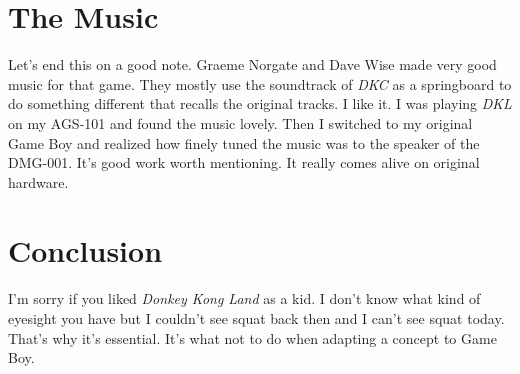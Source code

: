 \documentclass{book}
\begin{document}
\FloatBarrier\section*{The Music}
Let’s end this on a good note. Graeme Norgate and Dave Wise made very good music for that game. They mostly use the soundtrack of \emph{DKC} as a springboard to do something different that recalls the original tracks. I like it. I was playing \emph{DKL} on my AGS-101 and found the music lovely. Then I switched to my original Game Boy and realized how finely tuned the music was to the speaker of the DMG-001. It’s good work worth mentioning. It really comes alive on original hardware.\par
\FloatBarrier\section*{Conclusion}
I’m sorry if you liked \emph{Donkey Kong Land} as a kid. I don’t know what kind of eyesight you have but I couldn’t see squat back then and I can’t see squat today. That’s why it’s essential. It’s what not to do when adapting a concept to Game Boy.\par
\end{document}
